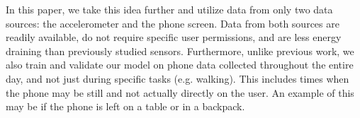 In this paper, we take this idea further and utilize data from only two data sources: the accelerometer and the phone screen. 
Data from both sources are readily available, do not require specific user permissions, and are less energy draining than previously studied sensors.
Furthermore, unlike previous work, we also train and validate our model on phone data collected throughout the entire day, and not just during specific tasks (e.g. walking).
This includes times when the phone may be still and not actually directly on the user.
An example of this may be if the phone is left on a table or in a backpack. 







